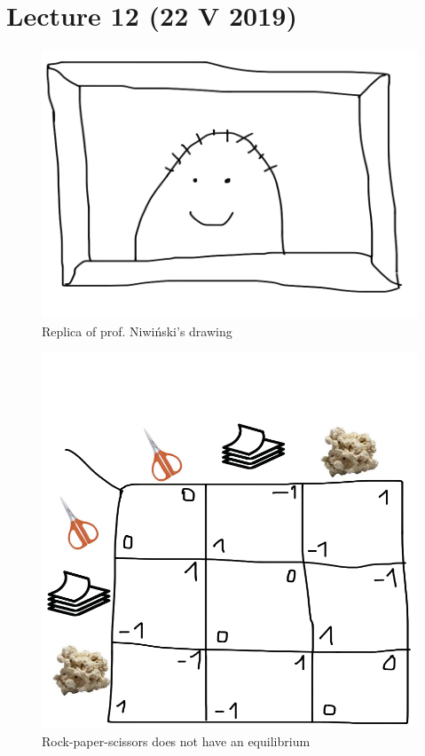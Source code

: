 \section{Lecture 12 (22 V 2019)}
\begin{figure}[H]
    \centering
    \caption{Replica of prof. Niwiński's drawing}
    \includegraphics[scale=0.1]{content/graphics/game25.png}
\end{figure}
\begin{figure}[H]
    \centering
    \caption{Rock-paper-scissors does not have an equilibrium}
    \includegraphics[scale=0.1]{content/graphics/game26.png}
\end{figure}

